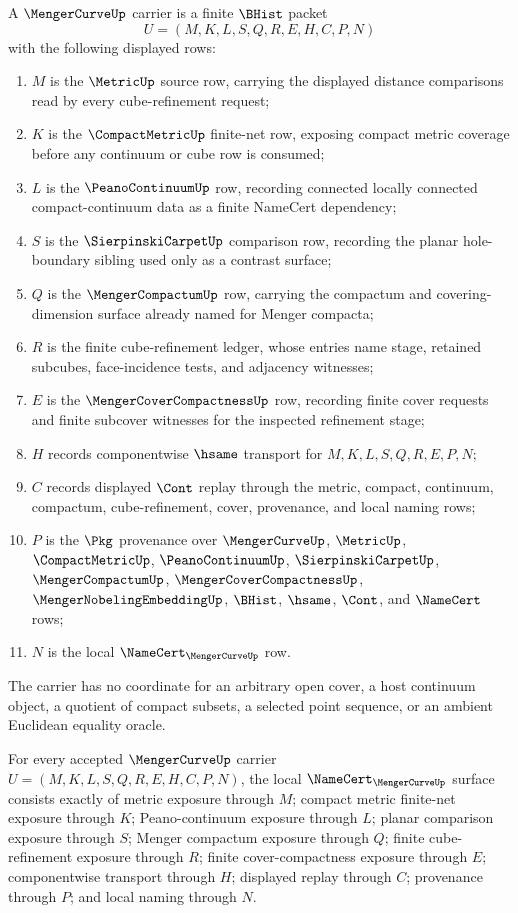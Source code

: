 \begin{definition}
\label{def:menger-curve-carrier}
A $\MengerCurveUp$ carrier is a finite $\BHist$ packet
$$
U=(M,K,L,S,Q,R,E,H,C,P,N)
$$
with the following displayed rows:
\begin{enumerate}
\item $M$ is the $\MetricUp$ source row, carrying the displayed distance comparisons read by every cube-refinement request;
\item $K$ is the $\CompactMetricUp$ finite-net row, exposing compact metric coverage before any continuum or cube row is consumed;
\item $L$ is the $\PeanoContinuumUp$ row, recording connected locally connected compact-continuum data as a finite NameCert dependency;
\item $S$ is the $\SierpinskiCarpetUp$ comparison row, recording the planar hole-boundary sibling used only as a contrast surface;
\item $Q$ is the $\MengerCompactumUp$ row, carrying the compactum and covering-dimension surface already named for Menger compacta;
\item $R$ is the finite cube-refinement ledger, whose entries name stage, retained subcubes, face-incidence tests, and adjacency witnesses;
\item $E$ is the $\MengerCoverCompactnessUp$ row, recording finite cover requests and finite subcover witnesses for the inspected refinement stage;
\item $H$ records componentwise $\hsame$ transport for $M,K,L,S,Q,R,E,P,N$;
\item $C$ records displayed $\Cont$ replay through the metric, compact, continuum, compactum, cube-refinement, cover, provenance, and local naming rows;
\item $P$ is the $\Pkg$ provenance over $\MengerCurveUp$, $\MetricUp$, $\CompactMetricUp$, $\PeanoContinuumUp$, $\SierpinskiCarpetUp$, $\MengerCompactumUp$, $\MengerCoverCompactnessUp$, $\MengerNobelingEmbeddingUp$, $\BHist$, $\hsame$, $\Cont$, and $\NameCert$ rows;
\item $N$ is the local $\NameCert_{\MengerCurveUp}$ row.
\end{enumerate}
The carrier has no coordinate for an arbitrary open cover, a host continuum object, a quotient of compact subsets, a selected point sequence, or an ambient Euclidean equality oracle.
\end{definition}

\begin{theorem}
\label{thm:menger-curve-namecert-obligations}
For every accepted $\MengerCurveUp$ carrier $U=(M,K,L,S,Q,R,E,H,C,P,N)$, the local $\NameCert_{\MengerCurveUp}$ surface consists exactly of metric exposure through $M$; compact metric finite-net exposure through $K$; Peano-continuum exposure through $L$; planar comparison exposure through $S$; Menger compactum exposure through $Q$; finite cube-refinement exposure through $R$; finite cover-compactness exposure through $E$; componentwise transport through $H$; displayed replay through $C$; provenance through $P$; and local naming through $N$.
\end{theorem}

